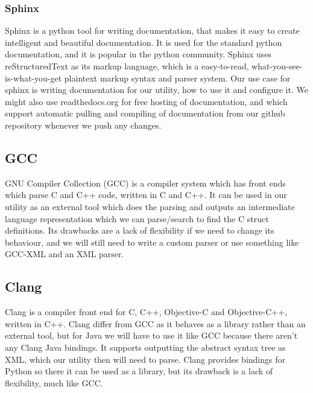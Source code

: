 \begin{description}
\subsubsection{Sphinx}
Sphinx is a python tool for writing documentation, that makes it easy to create
intelligent and beautiful documentation. It is used for the standard python
documentation, and it is  popular in the python community. Sphinx uses
reStructuredText as its markup language, which is a easy-to-read,
what-you-see-is-what-you-get plaintext markup syntax and parser system. Our use
case for sphinx is writing documentation for our utility, how to use it and
configure it. We might also use readthedocs.org for free hosting of
documentation, and which support automatic pulling and compiling of
documentation from our github repository whenever we push any changes.

\subsection{GCC}
GNU Compiler Collection (GCC) is a compiler system which has front ends which
parse C and C++ code, written in C and C++. It can be used in our utility as
an external tool which does the parsing and outputs an intermediate language
representation which we can parse/search to find the C struct definitions. Its
drawbacks are a lack of flexibility if we need to change its behaviour, and we
will still need to write a custom parser or use something like GCC-XML and an
XML parser. 

\subsection{Clang}
Clang is a compiler front end for C, C++, Objective-C and Objective-C++,
written in C++. Clang differ from GCC as it behaves as a library rather than an
external tool, but for Java we will have to use it like GCC because there
aren’t any Clang Java bindings. It supports outputting the abstract syntax
tree as XML, which our utility then will need to parse. Clang provides bindings
for Python so there it can be used as a library, but its drawback is a lack of
flexibility, much like GCC.


\end{description}
